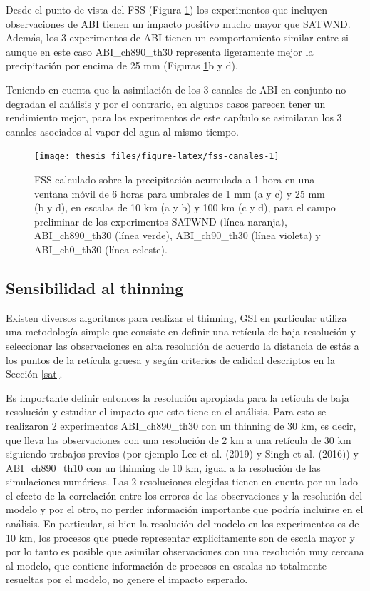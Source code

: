 \documentclass[12pt,oneside,a4paper]{reedthesis}
\begin{document}
Desde el punto de vista del FSS (Figura \ref{fig:fss-canales}) los experimentos que incluyen observaciones de ABI tienen un impacto positivo mucho mayor que SATWND. Además, los 3 experimentos de ABI tienen un comportamiento similar entre si aunque en este caso ABI\_ch890\_th30 representa ligeramente mejor la precipitación por encima de 25 mm (Figuras \ref{fig:fss-canales}b y d).

Teniendo en cuenta que la asimilación de los 3 canales de ABI en conjunto no degradan el análisis y por el contrario, en algunos casos parecen tener un rendimiento mejor, para los experimentos de este capítulo se asimilaran los 3 canales asociados al vapor del agua al mismo tiempo.


\begin{figure}
\texttt{[image: thesis\_files/figure-latex/fss-canales-1]} \caption{FSS calculado sobre la precipitación acumulada a 1 hora en una ventana móvil de 6 horas para umbrales de 1 mm (a y c) y 25 mm (b y d), en escalas de 10 km (a y b) y 100 km (c y d), para el campo preliminar de los experimentos SATWND (línea naranja), ABI\_ch890\_th30 (línea verde), ABI\_ch90\_th30 (línea violeta) y ABI\_ch0\_th30 (línea celeste).}\label{fig:fss-canales}
\end{figure}
\hypertarget{thinning}{%
\subsection{Sensibilidad al thinning}\label{thinning}}

Existen diversos algoritmos para realizar el thinning, GSI en particular utiliza una metodología simple que consiste en definir una retícula de baja resolución y seleccionar las observaciones en alta resolución de acuerdo la distancia de estás a los puntos de la retícula gruesa y según criterios de calidad descriptos en la Sección \ref{sat}.

Es importante definir entonces la resolución apropiada para la retícula de baja resolución y estudiar el impacto que esto tiene en el análisis. Para esto se realizaron 2 experimentos ABI\_ch890\_th30 con un thinning de 30 km, es decir, que lleva las observaciones con una resolución de 2 km a una retícula de 30 km siguiendo trabajos previos (por ejemplo Lee et al. (2019) y Singh et al. (2016)) y ABI\_ch890\_th10 con un thinning de 10 km, igual a la resolución de las simulaciones numéricas. Las 2 resoluciones elegidas tienen en cuenta por un lado el efecto de la correlación entre los errores de las observaciones y la resolución del modelo y por el otro, no perder información importante que podría incluirse en el análisis. En particular, si bien la resolución del modelo en los experimentos es de 10 km, los procesos que puede representar explicitamente son de escala mayor y por lo tanto es posible que asimilar observaciones con una resolución muy cercana al modelo, que contiene información de procesos en escalas no totalmente resueltas por el modelo, no genere el impacto esperado.
\end{document}
